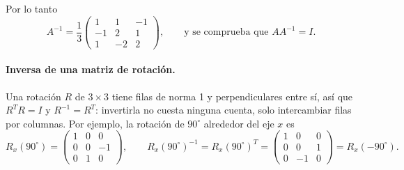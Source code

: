Por lo tanto
\begin{equation}
A^{-1}=\frac{1}{3}\begin{pmatrix} 1 & 1 & -1 \\ -1 & 2 & 1 \\ 1 & -2 & 2 \end{pmatrix} ,\qquad\text{y se comprueba que } AA^{-1}=I.
\end{equation}

\paragraph{Inversa de una matriz de rotación.} Una rotación $R$ de $3\times3$ tiene filas de norma 1 y
perpendiculares entre sí, así que $R^{T}R=I$ y $R^{-1}=R^{T}$: invertirla no cuesta ninguna
cuenta, solo intercambiar filas por columnas. Por ejemplo, la rotación de $90^\circ$ alrededor del eje $x$ es
\begin{equation}
R_x(90^\circ)=\begin{pmatrix}1&0&0\\0&0&-1\\0&1&0\end{pmatrix},\qquad
R_x(90^\circ)^{-1}=R_x(90^\circ)^{T}=\begin{pmatrix}1&0&0\\0&0&1\\0&-1&0\end{pmatrix}=R_x(-90^\circ).
\end{equation}

